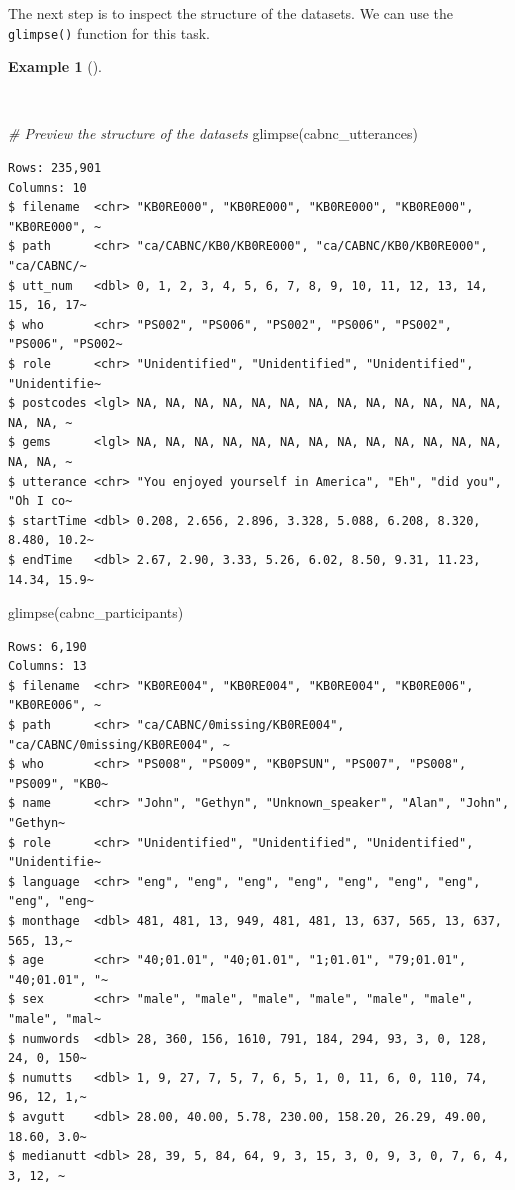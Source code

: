 \documentclass[
  letterpaper,
]{book}
\newenvironment{Shaded}{\begin{snugshade}}{\end{snugshade}}
\newcommand{\CommentTok}[1]{\textcolor[rgb]{0.00,0.00,0.00}{\textit{#1}}}
\newcommand{\FunctionTok}[1]{\textcolor[rgb]{0.00,0.00,0.00}{#1}}
\newcommand{\NormalTok}[1]{\textcolor[rgb]{0.00,0.00,0.00}{#1}}
\theoremstyle{definition}
\newtheorem{example}{Example}[chapter]
\theoremstyle{remark}
\begin{document}
The next step is to inspect the structure of the datasets. We can use
the \texttt{glimpse()} function for this task.

\begin{example}[]\protect\hypertarget{exm-curate-cabnc-glimpse}{}\label{exm-curate-cabnc-glimpse}

~

\begin{Shaded}
\begin{Highlighting}[]
\CommentTok{\# Preview the structure of the datasets}
\FunctionTok{glimpse}\NormalTok{(cabnc\_utterances)}
\end{Highlighting}
\end{Shaded}

\begin{verbatim}
Rows: 235,901
Columns: 10
$ filename  <chr> "KB0RE000", "KB0RE000", "KB0RE000", "KB0RE000", "KB0RE000", ~
$ path      <chr> "ca/CABNC/KB0/KB0RE000", "ca/CABNC/KB0/KB0RE000", "ca/CABNC/~
$ utt_num   <dbl> 0, 1, 2, 3, 4, 5, 6, 7, 8, 9, 10, 11, 12, 13, 14, 15, 16, 17~
$ who       <chr> "PS002", "PS006", "PS002", "PS006", "PS002", "PS006", "PS002~
$ role      <chr> "Unidentified", "Unidentified", "Unidentified", "Unidentifie~
$ postcodes <lgl> NA, NA, NA, NA, NA, NA, NA, NA, NA, NA, NA, NA, NA, NA, NA, ~
$ gems      <lgl> NA, NA, NA, NA, NA, NA, NA, NA, NA, NA, NA, NA, NA, NA, NA, ~
$ utterance <chr> "You enjoyed yourself in America", "Eh", "did you", "Oh I co~
$ startTime <dbl> 0.208, 2.656, 2.896, 3.328, 5.088, 6.208, 8.320, 8.480, 10.2~
$ endTime   <dbl> 2.67, 2.90, 3.33, 5.26, 6.02, 8.50, 9.31, 11.23, 14.34, 15.9~
\end{verbatim}

\begin{Shaded}
\begin{Highlighting}[]
\FunctionTok{glimpse}\NormalTok{(cabnc\_participants)}
\end{Highlighting}
\end{Shaded}

\begin{verbatim}
Rows: 6,190
Columns: 13
$ filename  <chr> "KB0RE004", "KB0RE004", "KB0RE004", "KB0RE006", "KB0RE006", ~
$ path      <chr> "ca/CABNC/0missing/KB0RE004", "ca/CABNC/0missing/KB0RE004", ~
$ who       <chr> "PS008", "PS009", "KB0PSUN", "PS007", "PS008", "PS009", "KB0~
$ name      <chr> "John", "Gethyn", "Unknown_speaker", "Alan", "John", "Gethyn~
$ role      <chr> "Unidentified", "Unidentified", "Unidentified", "Unidentifie~
$ language  <chr> "eng", "eng", "eng", "eng", "eng", "eng", "eng", "eng", "eng~
$ monthage  <dbl> 481, 481, 13, 949, 481, 481, 13, 637, 565, 13, 637, 565, 13,~
$ age       <chr> "40;01.01", "40;01.01", "1;01.01", "79;01.01", "40;01.01", "~
$ sex       <chr> "male", "male", "male", "male", "male", "male", "male", "mal~
$ numwords  <dbl> 28, 360, 156, 1610, 791, 184, 294, 93, 3, 0, 128, 24, 0, 150~
$ numutts   <dbl> 1, 9, 27, 7, 5, 7, 6, 5, 1, 0, 11, 6, 0, 110, 74, 96, 12, 1,~
$ avgutt    <dbl> 28.00, 40.00, 5.78, 230.00, 158.20, 26.29, 49.00, 18.60, 3.0~
$ medianutt <dbl> 28, 39, 5, 84, 64, 9, 3, 15, 3, 0, 9, 3, 0, 7, 6, 4, 3, 12, ~
\end{verbatim}

\end{example}
\end{document}
